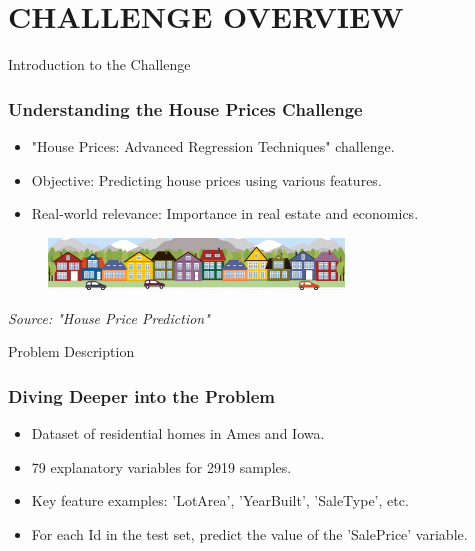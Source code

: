 \section{CHALLENGE OVERVIEW}
\label{challenge_overview_section}


\begin{frame}{Introduction to the Challenge}
    \frametitle{Understanding the House Prices Challenge}
    \begin{itemize}
        \item "House Prices: Advanced Regression Techniques" challenge.
        \item Objective: Predicting house prices using various features.
        \item Real-world relevance: Importance in real estate and economics.      
    \end{itemize}
    \vspace{1.5cm}
    \begin{figure}
        \includegraphics[width=0.7\textwidth]{figures/housesbanner.png} %
    \end{figure}
    \vspace{1cm}
    \center
    \tiny
    \textit{Source: "House Price Prediction" \cite{kaggle_house_price_prediction}}
\end{frame}

\begin{frame}{Problem Description}
    \frametitle{Diving Deeper into the Problem}
    \begin{itemize}
        \item Dataset of residential homes in Ames and Iowa.
        \item 79 explanatory variables for 2919 samples.
        \item Key feature examples: 'LotArea', 'YearBuilt', 'SaleType', etc.
        \item For each Id in the test set, predict the value of the 'SalePrice' variable.
    \end{itemize}
\end{frame}

